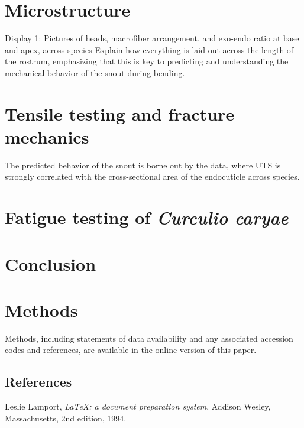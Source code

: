 \documentclass[twocolumn, linenumbers, superscriptaddress]{revtex4-1}
\begin{document}
	\section*{Microstructure}
		Display 1: Pictures of heads, macrofiber arrangement, and exo-endo ratio at base and apex, across species
		Explain how everything is laid out across the length of the rostrum, emphasizing that this is key to predicting and understanding the mechanical behavior of the snout during bending.
		\lipsum
	
	\section*{Tensile testing and fracture mechanics}
		The predicted behavior of the snout is borne out by the data, where UTS is strongly correlated with the cross-sectional area of the endocuticle across species.
		\lipsum
		
	\section*{Fatigue testing of \textit{Curculio caryae}}
		\lipsum

	\section*{Conclusion}
		\blindtext[3]

	\section*{Methods}
		Methods, including statements of data availability and any associated accession codes and references, are available in the online version of this paper.
	
	\begin{thebibliography}{50}
		\section*{References}	
			Leslie Lamport,
			\textit{\LaTeX: a document preparation system},
			Addison Wesley, Massachusetts,
			2nd edition,
			1994.

	\end{thebibliography}
\end{document}
